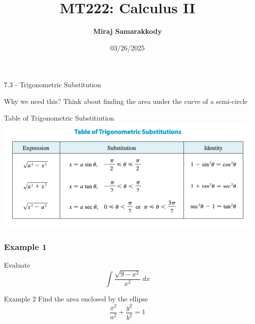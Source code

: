 \documentclass{beamer}
\title{MT222: Calculus II}
\author{\textbf{Miraj Samarakkody}}
\institute{Tougaloo College}
\date{03/26/2025}
\begin{document}
\begin{frame}
    \titlepage
\end{frame}




\begin{frame}{}
    \begin{center}
        \Huge{7.3 - Trigonometric Substitution}
    \end{center}
    
\end{frame}

\begin{frame}{Why we need this?}
    Think about finding the area under the curve of a semi-circle
\end{frame}

\begin{frame}{Table of Trigonometric Substitiution}
    \includegraphics[scale=0.6]{figures/fig_1.png}
\end{frame}

\begin{frame}
    \frametitle{Example 1}
Evaluate \[\int \dfrac{\sqrt{9-x^2}}{x^2}~dx\]
\end{frame}

\begin{frame}{Example 2}
    Find the area enclosed by the ellipse \[\dfrac{x^2}{a^2}+ \dfrac{y^2}{b^2}=1\]
\end{frame}
\end{document}
